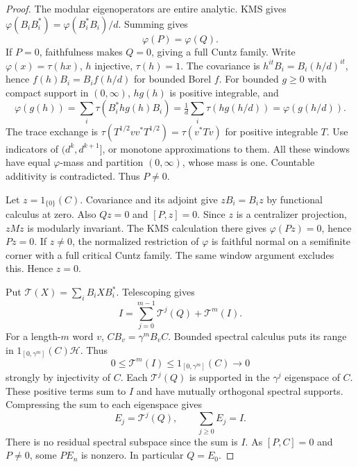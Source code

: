 \begin{proof}
The modular eigenoperators are entire analytic. KMS gives $\varphi(B_iB_i^*)=\varphi(B_i^*B_i)/d$. Summing gives
\begin{equation}\label{eq:defectmass}
 \varphi(P)=\varphi(Q).
\end{equation}
If $P=0$, faithfulness makes $Q=0$, giving a full Cuntz family. Write $\varphi(x)=\tau(hx)$, $h$ injective, $\tau(h)=1$. The covariance is $h^{it}B_i=B_i(h/d)^{it}$, hence $f(h)B_i=B_if(h/d)$ for bounded Borel $f$. For bounded $g\geq0$ with compact support in $(0,\infty)$, $hg(h)$ is positive integrable, and
\[
 \varphi(g(h))=\sum_i\tau(B_i^*hg(h)B_i)
 =\tfrac1d\sum_i\tau(hg(h/d))=\varphi(g(h/d)).
\]
The trace exchange is $\tau(T^{1/2}vv^*T^{1/2})=\tau(v^*Tv)$ for positive integrable $T$. Use indicators of $(d^k,d^{k+1}]$, or monotone approximations to them. All these windows have equal $\varphi$-mass and partition $(0,\infty)$, whose mass is one. Countable additivity is contradicted. Thus $P\ne0$.

Let $z=1_{\{0\}}(C)$. Covariance and its adjoint give $zB_i=B_iz$ by functional calculus at zero. Also $Qz=0$ and $[P,z]=0$. Since $z$ is a centralizer projection, $zMz$ is modularly invariant. The KMS calculation there gives $\varphi(Pz)=0$, hence $Pz=0$. If $z\ne0$, the normalized restriction of $\varphi$ is faithful normal on a semifinite corner with a full critical Cuntz family. The same window argument excludes this. Hence $z=0$.

Put $\mathcal T(X)=\sum_iB_iXB_i^*$. Telescoping gives
\begin{equation}\label{eq:telescope}
 I=\sum_{j=0}^{m-1}\mathcal T^j(Q)+\mathcal T^m(I).
\end{equation}
For a length-$m$ word $v$, $CB_v=\gamma^mB_vC$. Bounded spectral calculus puts its range in $1_{[0,\gamma^m]}(C)\mathcal H$. Thus
\[
 0\leq\mathcal T^m(I)\leq1_{[0,\gamma^m]}(C)\longrightarrow0
\]
strongly by injectivity of $C$. Each $\mathcal T^j(Q)$ is supported in the $\gamma^j$ eigenspace of $C$. These positive terms sum to $I$ and have mutually orthogonal spectral supports. Compressing the sum to each eigenspace gives
\begin{equation}\label{eq:En}
 E_j=\mathcal T^j(Q),\qquad \sum_{j\geq0}E_j=I.
\end{equation}
There is no residual spectral subspace since the sum is $I$. As $[P,C]=0$ and $P\ne0$, some $PE_n$ is nonzero. In particular $Q=E_0$.
\end{proof}


